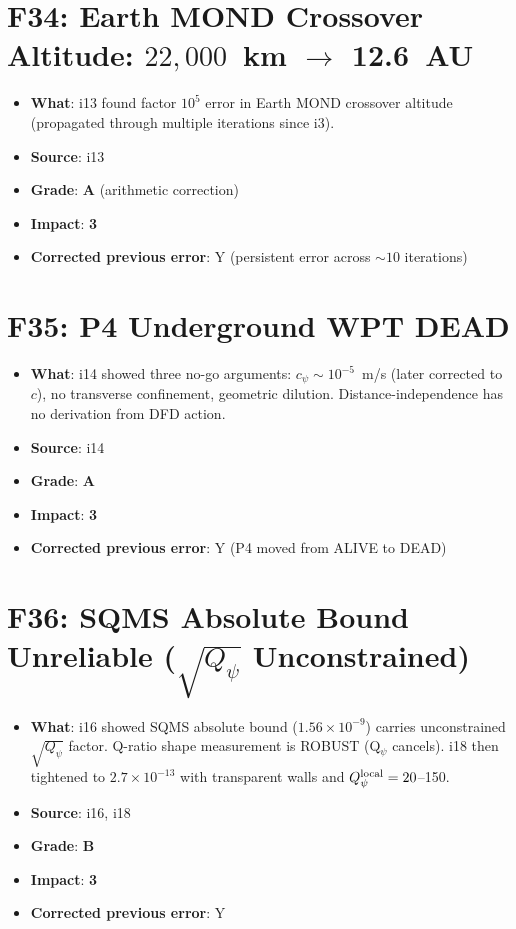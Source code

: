 \documentclass[11pt,a4paper]{article}
\newcommand{\grade}[1]{\textbf{#1}}
\newcommand{\impact}[1]{\textbf{#1}}
\begin{document}
\section{F34: Earth MOND Crossover Altitude: $22{,}000$~km $\to$ 12.6~AU}
\begin{itemize}[nosep]
\item \textbf{What}: i13 found factor $10^5$ error in Earth MOND crossover altitude (propagated through multiple iterations since i3).
\item \textbf{Source}: i13
\item \textbf{Grade}: \grade{A} (arithmetic correction)
\item \textbf{Impact}: \impact{3}
\item \textbf{Corrected previous error}: Y (persistent error across $\sim 10$ iterations)
\end{itemize}

\section{F35: P4 Underground WPT DEAD}
\begin{itemize}[nosep]
\item \textbf{What}: i14 showed three no-go arguments: $c_\psi \sim 10^{-5}$~m/s (later corrected to $c$), no transverse confinement, geometric dilution. Distance-independence has no derivation from DFD action.
\item \textbf{Source}: i14
\item \textbf{Grade}: \grade{A}
\item \textbf{Impact}: \impact{3}
\item \textbf{Corrected previous error}: Y (P4 moved from ALIVE to DEAD)
\end{itemize}

\section{F36: SQMS Absolute Bound Unreliable ($\sqrt{Q_\psi}$ Unconstrained)}
\begin{itemize}[nosep]
\item \textbf{What}: i16 showed SQMS absolute bound ($1.56 \times 10^{-9}$) carries unconstrained $\sqrt{Q_\psi}$ factor. Q-ratio shape measurement is ROBUST (Q$_\psi$ cancels). i18 then tightened to $2.7 \times 10^{-13}$ with transparent walls and $Q_\psi^{\rm local} = 20$--150.
\item \textbf{Source}: i16, i18
\item \textbf{Grade}: \grade{B}
\item \textbf{Impact}: \impact{3}
\item \textbf{Corrected previous error}: Y
\end{itemize}
\end{document}
